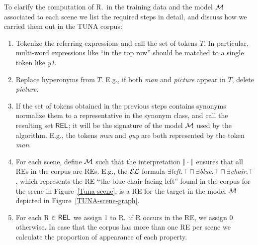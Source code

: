 
To clarify the computation of R.\puse\ in the training data and the model $\mathcal{M}$ associated to each scene we list the required steps in detail, 
and discuss how we carried them out in the TUNA corpus:

\vspace*{-.3cm}
\begin{enumerate}
\item Tokenize the referring expressions and call the set of tokens $T$. In particular, multi-word expressions like ``in the top row'' 
should be matched to a single token like \emph{y1}.

\item Replace hyperonyms from $T$. E.g., if both \emph{man} and \emph{picture} appear in $T$, delete \emph{picture}.

\item If the set of tokens obtained in the previous steps contains synonyms normalize them to a representative in the synonym class, 
and call the resulting set $\textsf{REL}$; it will be the signature of the model $\mathcal{M}$ used by the algorithm. E.g., the tokens \emph{man} 
and \emph{guy} are both represented by the token \emph{man}.

\item For each scene, define $\mathcal{M}$ such that the interpretation $|\!|\cdot|\!|$ ensures that all REs in the corpus are REs. E.g., the $\mathcal{EL}$ formula $\exists$\emph{left}.$\top \sqcap \exists$\emph{blue}.$\top \sqcap \exists$\emph{chair}.$\top$, which represents the RE ``the blue chair facing left'' found in the corpus for the scene in Figure~\ref{Tuna-scene}, is a RE for the target in the model $\mathcal{M}$ depicted in Figure~\ref{TUNA-scene-graph}. 

\item For each R $\in \textsf{REL}$ we assign 1 to R.\puse\ if R occurs in the RE, we assign 0 otherwise. In case that the corpus has more than one RE per scene we calculate the proportion of appearance of each property.

\end{enumerate}


